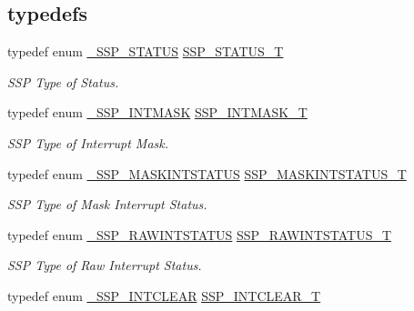\subsection*{\textquotesingle{}typedefs\textquotesingle{}}
\begin{DoxyCompactItemize}
\item 
typedef enum \hyperlink{group___s_s_p__18_x_x__43_x_x_ga4ec33a0121a2ccab848c7b37907d9e9d}{\+\_\+\+S\+S\+P\+\_\+\+S\+T\+A\+T\+US} \hyperlink{group___s_s_p__18_x_x__43_x_x_gad95eaf4325a2ec8e457b309d21d6987d}{S\+S\+P\+\_\+\+S\+T\+A\+T\+U\+S\+\_\+T}
\begin{DoxyCompactList}\small\item\em S\+SP Type of Status. \end{DoxyCompactList}\item 
typedef enum \hyperlink{group___s_s_p__18_x_x__43_x_x_gab6a0ac593093184dd21c95f53b30f4ef}{\+\_\+\+S\+S\+P\+\_\+\+I\+N\+T\+M\+A\+SK} \hyperlink{group___s_s_p__18_x_x__43_x_x_ga84198f10a9a371b8523c09a850399bf4}{S\+S\+P\+\_\+\+I\+N\+T\+M\+A\+S\+K\+\_\+T}
\begin{DoxyCompactList}\small\item\em S\+SP Type of Interrupt Mask. \end{DoxyCompactList}\item 
typedef enum \hyperlink{group___s_s_p__18_x_x__43_x_x_gafaff4574b830e5b94dcaf7ca8da399e8}{\+\_\+\+S\+S\+P\+\_\+\+M\+A\+S\+K\+I\+N\+T\+S\+T\+A\+T\+US} \hyperlink{group___s_s_p__18_x_x__43_x_x_gac0b1a846ede1f57c5fa27d4163acdbe9}{S\+S\+P\+\_\+\+M\+A\+S\+K\+I\+N\+T\+S\+T\+A\+T\+U\+S\+\_\+T}
\begin{DoxyCompactList}\small\item\em S\+SP Type of Mask Interrupt Status. \end{DoxyCompactList}\item 
typedef enum \hyperlink{group___s_s_p__18_x_x__43_x_x_ga2042535e55396776c81a7235ed95db35}{\+\_\+\+S\+S\+P\+\_\+\+R\+A\+W\+I\+N\+T\+S\+T\+A\+T\+US} \hyperlink{group___s_s_p__18_x_x__43_x_x_gaf901cb9befcf9302650fed7f1ddba443}{S\+S\+P\+\_\+\+R\+A\+W\+I\+N\+T\+S\+T\+A\+T\+U\+S\+\_\+T}
\begin{DoxyCompactList}\small\item\em S\+SP Type of Raw Interrupt Status. \end{DoxyCompactList}\item 
typedef enum \hyperlink{group___s_s_p__18_x_x__43_x_x_ga59cc14c5381f32c16286c45bd6a3ece0}{\+\_\+\+S\+S\+P\+\_\+\+I\+N\+T\+C\+L\+E\+AR} \hyperlink{group___s_s_p__18_x_x__43_x_x_gadc98b69a8cb7a5afef8dd81bebbfc66d}{S\+S\+P\+\_\+\+I\+N\+T\+C\+L\+E\+A\+R\+\_\+T}

\end{DoxyCompactItemize}
